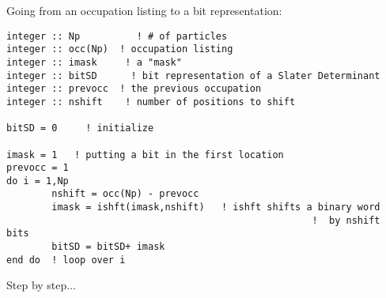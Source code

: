 Going from an occupation listing to a bit representation:


\begin{verbatim}
integer :: Np          ! # of particles
integer :: occ(Np)  ! occupation listing
integer :: imask     ! a "mask"
integer :: bitSD      ! bit representation of a Slater Determinant
integer :: prevocc  ! the previous occupation
integer :: nshift    ! number of positions to shift

bitSD = 0     ! initialize

imask = 1   ! putting a bit in the first location
prevocc = 1
do i = 1,Np
        nshift = occ(Np) - prevocc
        imask = ishft(imask,nshift)   ! ishft shifts a binary word 
                                                      !  by nshift bits
        bitSD = bitSD+ imask
end do  ! loop over i
\end{verbatim}

Step by step...
\medskip

